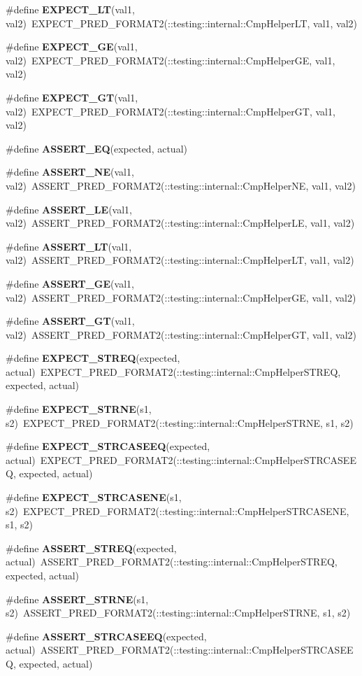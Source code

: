 \begin{CompactItemize}
\item 
\#define {\bf EXPECT\_\-LT}(val1, val2)~EXPECT\_\-PRED\_\-FORMAT2(::testing::internal::CmpHelperLT, val1, val2)
\item 
\#define {\bf EXPECT\_\-GE}(val1, val2)~EXPECT\_\-PRED\_\-FORMAT2(::testing::internal::CmpHelperGE, val1, val2)
\item 
\#define {\bf EXPECT\_\-GT}(val1, val2)~EXPECT\_\-PRED\_\-FORMAT2(::testing::internal::CmpHelperGT, val1, val2)
\item 
\#define {\bf ASSERT\_\-EQ}(expected, actual)
\item 
\#define {\bf ASSERT\_\-NE}(val1, val2)~ASSERT\_\-PRED\_\-FORMAT2(::testing::internal::CmpHelperNE, val1, val2)
\item 
\#define {\bf ASSERT\_\-LE}(val1, val2)~ASSERT\_\-PRED\_\-FORMAT2(::testing::internal::CmpHelperLE, val1, val2)
\item 
\#define {\bf ASSERT\_\-LT}(val1, val2)~ASSERT\_\-PRED\_\-FORMAT2(::testing::internal::CmpHelperLT, val1, val2)
\item 
\#define {\bf ASSERT\_\-GE}(val1, val2)~ASSERT\_\-PRED\_\-FORMAT2(::testing::internal::CmpHelperGE, val1, val2)
\item 
\#define {\bf ASSERT\_\-GT}(val1, val2)~ASSERT\_\-PRED\_\-FORMAT2(::testing::internal::CmpHelperGT, val1, val2)
\item 
\#define {\bf EXPECT\_\-STREQ}(expected, actual)~EXPECT\_\-PRED\_\-FORMAT2(::testing::internal::CmpHelperSTREQ, expected, actual)
\item 
\#define {\bf EXPECT\_\-STRNE}(s1, s2)~EXPECT\_\-PRED\_\-FORMAT2(::testing::internal::CmpHelperSTRNE, s1, s2)
\item 
\#define {\bf EXPECT\_\-STRCASEEQ}(expected, actual)~EXPECT\_\-PRED\_\-FORMAT2(::testing::internal::CmpHelperSTRCASEEQ, expected, actual)
\item 
\#define {\bf EXPECT\_\-STRCASENE}(s1, s2)~EXPECT\_\-PRED\_\-FORMAT2(::testing::internal::CmpHelperSTRCASENE, s1, s2)
\item 
\#define {\bf ASSERT\_\-STREQ}(expected, actual)~ASSERT\_\-PRED\_\-FORMAT2(::testing::internal::CmpHelperSTREQ, expected, actual)
\item 
\#define {\bf ASSERT\_\-STRNE}(s1, s2)~ASSERT\_\-PRED\_\-FORMAT2(::testing::internal::CmpHelperSTRNE, s1, s2)
\item 
\#define {\bf ASSERT\_\-STRCASEEQ}(expected, actual)~ASSERT\_\-PRED\_\-FORMAT2(::testing::internal::CmpHelperSTRCASEEQ, expected, actual)
\item 

\end{CompactItemize}
